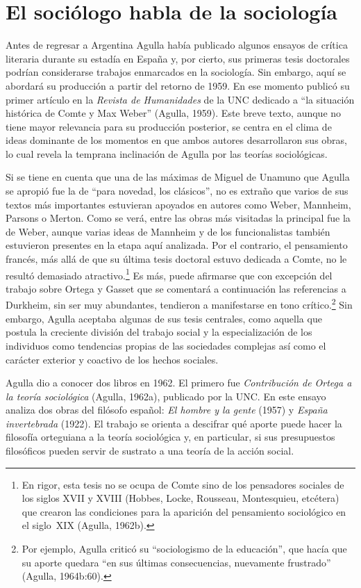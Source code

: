 \section{El sociólogo habla de la sociología}

Antes de regresar a Argentina Agulla había publicado algunos ensayos de crítica literaria durante su estadía en España y, por cierto, sus primeras tesis doctorales podrían considerarse trabajos enmarcados en la sociología. Sin embargo, aquí se abordará su producción a partir del retorno de 1959. En ese momento publicó su primer artículo en la \emph{Revista de Humanidades} de la UNC dedicado a \enquote{la situación histórica de Comte y Max Weber} (Agulla, 1959). Este breve texto, aunque no tiene mayor relevancia para su producción posterior, se centra en el clima de ideas dominante de los momentos en que ambos autores desarrollaron sus obras, lo cual revela la temprana inclinación de Agulla por las teorías sociológicas.

Si se tiene en cuenta que una de las máximas de Miguel de Unamuno que Agulla se apropió fue la de \enquote{para novedad, los clásicos}, no es extraño que varios de sus textos más importantes estuvieran apoyados en autores como Weber, Mannheim, Parsons o Merton. Como se verá, entre las obras más visitadas la principal fue la de Weber, aunque varias ideas de Mannheim y de los funcionalistas también estuvieron presentes en la etapa aquí analizada. Por el contrario, el pensamiento francés, más allá de que su última tesis doctoral estuvo dedicada a Comte, no le resultó demasiado atractivo.\footnote{En rigor, esta tesis no se ocupa de Comte sino de los pensadores sociales de los siglos XVII y XVIII (Hobbes, Locke, Rousseau, Montesquieu, etcétera) que crearon las condiciones para la aparición del pensamiento sociológico en el siglo~XIX (Agulla, 1962b).} Es más, puede afirmarse que con excepción del trabajo sobre Ortega y Gasset que se comentará a continuación las referencias a Durkheim, sin ser muy abundantes, tendieron a manifestarse en tono crítico.\footnote{Por ejemplo, Agulla criticó su \enquote{sociologismo de la educación}, que hacía que su aporte quedara \enquote{en sus últimas consecuencias, nuevamente frustrado} (Agulla, 1964b:60).} Sin embargo, Agulla aceptaba algunas de sus tesis centrales, como aquella que postula la creciente división del trabajo social y la especialización de los individuos como tendencias propias de las sociedades complejas así como el carácter exterior y coactivo de los hechos sociales.

Agulla dio a conocer dos libros en 1962. El primero fue \emph{Contribución de Ortega a la teoría sociológica} (Agulla, 1962a), publicado por la UNC. En este ensayo analiza dos obras del filósofo español: \emph{El hombre y la gente} (1957) y \emph{España invertebrada} (1922). El trabajo se orienta a descifrar qué aporte puede hacer la filosofía orteguiana a la teoría sociológica y, en particular, si sus presupuestos filosóficos pueden servir de sustrato a una teoría de la acción social.

